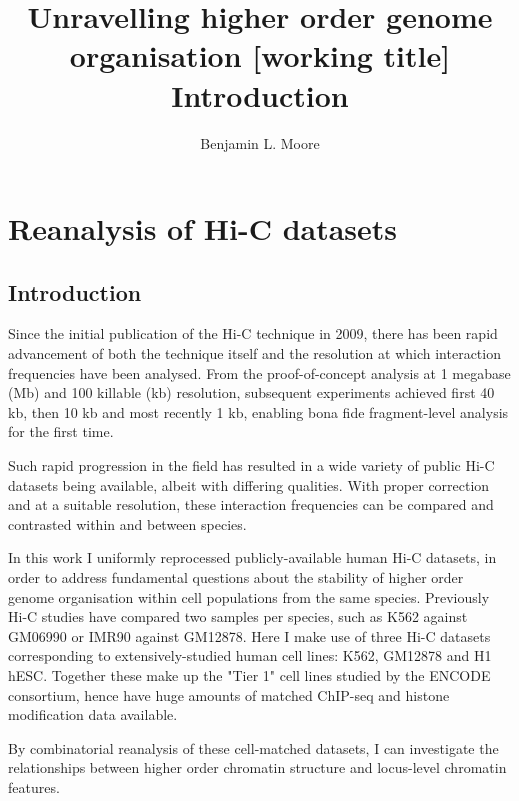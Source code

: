 \documentclass[a4paper,10pt,oneside]{book}
\title{ \vspace{3in} Unravelling higher order genome organisation {\small [working
    title]} \\ \vspace{2em} {\large {\bf Introduction}} }
\author{Benjamin L. Moore}
\begin{document}
\maketitle

\chapter{Reanalysis of Hi-C datasets}

\section{Introduction}

Since the initial publication of the Hi-C technique in 2009,\cite{Lieberman2009} there has been rapid advancement of both the technique itself and the resolution at which interaction frequencies have been analysed. From the proof-of-concept analysis at 1 megabase (Mb) and 100 killable (kb) resolution,\cite{Lieberman2009} subsequent experiments achieved first 40 kb\cite{Dixon2012}, then 10 kb\cite{Jin2013} and most recently 1 kb\cite{Rao2014}, enabling bona fide fragment-level analysis for the first time.


Such rapid progression in the field has resulted in a wide variety of public Hi-C datasets being available, albeit with differing qualities. With proper correction and at a suitable resolution, these interaction frequencies can be compared and contrasted within and between species.

In this work I uniformly reprocessed publicly-available human Hi-C datasets, in order to address fundamental questions about the stability of higher order genome organisation within cell populations from the same species. Previously Hi-C studies have compared two samples per species, such as K562 against GM06990\cite{Lieberman2009} or IMR90 against GM12878.\cite{Dixon2012} Here I make use of three Hi-C datasets corresponding to extensively-studied human cell lines: K562, GM12878 and H1 hESC. Together these make up the "Tier 1" cell lines studied by the ENCODE consortium,\cite{Dunham2012} hence have huge amounts of matched ChIP-seq and histone modification data available. 

By combinatorial reanalysis of these cell-matched datasets, I can investigate the relationships between higher order chromatin structure and locus-level chromatin features.
\end{document}
